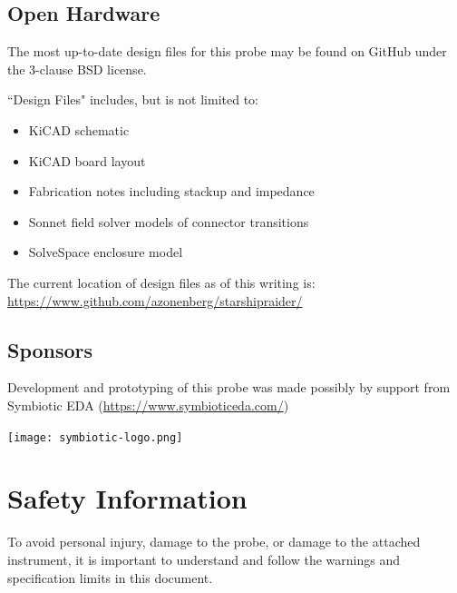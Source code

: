 \documentclass[11pt]{article}
\begin{document}
\subsection{Open Hardware}

The most up-to-date design files for this probe may be found on GitHub under the 3-clause BSD license.

``Design Files" includes, but is not limited to:
\begin{itemize}
\item KiCAD schematic
\item KiCAD board layout
\item Fabrication notes including stackup and impedance
\item Sonnet field solver models of connector transitions
\item SolveSpace enclosure model
\end{itemize}

The current location of design files as of this writing is: \url{https://www.github.com/azonenberg/starshipraider/}

\subsection{Sponsors}

Development and prototyping of this probe was made possibly by support from Symbiotic EDA
(\url{https://www.symbioticeda.com/})

\texttt{[image: symbiotic-logo.png]}

\pagebreak
\section{Safety Information}

To avoid personal injury, damage to the probe, or damage to the attached instrument, it is important to understand and
follow the warnings and specification limits in this document.
\end{document}
